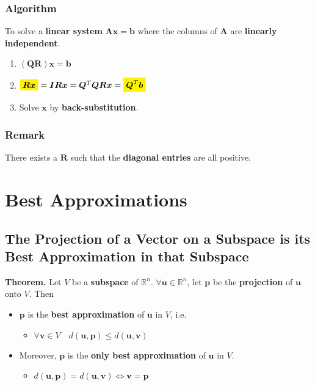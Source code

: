 \documentclass[../ma2001_notes.tex]{subfiles}
\begin{document}
\subsubsection{Algorithm}
To solve a \textbf{linear system} \(\bm{Ax}=\bm{b}\) where the columns of \(\bm{A}\) are \textbf{linearly independent}.
\begin{enumerate}
	\item\((\bm{QR})\bm{x}=\bm{b}\)
	\item\(\mathcolorbox{yellow}{\bm{Rx}}=\bm{IRx}=\bm{Q}^T\bm{QRx}=\mathcolorbox{yellow}{\bm{Q}^T\bm{b}}\)
	\item Solve \(\bm{x}\) by \textbf{back-substitution}.
\end{enumerate}


\subsubsection{Remark}
There exists a \(\bm{R}\) such that the \textbf{diagonal entries} are all positive.

\section{Best Approximations}

\subsection{The Projection of a Vector on a Subspace is its Best Approximation in that Subspace}
\textbf{Theorem.} Let \(V\) be a \textbf{subspace} of \(\mathbb{R}^n\). \(\forall\bm{u}\in\mathbb{R}^n\), let \(\bm{p}\) be the \textbf{projection} of \(\bm{u}\) onto \(V\). Then
\begin{itemize}
	\item\(\bm{p}\) is the \textbf{best approximation} of \(\bm{u}\) in \(V\), i.e.
	\begin{itemize}
		\item\(\forall\bm{v}\in V\quad d(\bm{u},\bm{p})\leq d(\bm{u},\bm{v})\)
	\end{itemize}
	\item Moreover, \(\bm{p}\) is the \textbf{only best approximation} of \(\bm{u}\) in \(V\).
	\begin{itemize}
		\item\(d(\bm{u},\bm{p})=d(\bm{u},\bm{v})\Leftrightarrow\bm{v}=\bm{p}\)
	\end{itemize}
\end{itemize}
\end{document}
